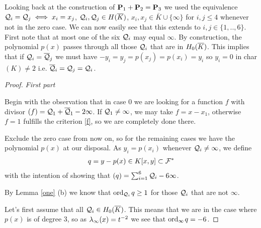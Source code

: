 \documentclass[english,11pt,a4paper]{article}
\begin{document}
\begin{remark}\label{alldiff}
  Looking back at the construction of $\P_1 + \P_2 = \P_3$ we used the equivalence $\q_i = \q_j \iff x_i = x_j$, $\q_i, \q_j \in \ekb$, $x_i, x_j \in \bar K \cup \{\infty\}$ for $i, j \leq 4$ whenever not in the zero case. We can now easily see that this extends to $i, j \in \{1,..,6\}$. First note that at most one of the six $\q_i$ may equal $\infty$. By construction, the polynomial $p(x)$ passes through all those $\q_i$ that are in $\enkb$. This implies that if $\q_i = \bar \q_j$ we must have $-y_i = y_j = p(x_j) = p(x_i) = y_i$ so $y_i = 0$ in char$(K) \neq 2$ i.e. $\bar \q_i =\q_j = \q_i$.
\end{remark}

\newpage
\begin{proof}\textit{First part}

  Begin with the observation that in case 0 we are looking for a function $f$ with divisor $(f) = \q_1 + \bar \q_1 - 2 \infty$. If $\q_1 \neq \infty$, we may take $f = x-x_1$, otherwise $f = 1$ fulfills the criterion \eqref{f}, so we are completely done there.

  Exclude the zero case from now on, so for the remaining cases we have the polynomial $p(x)$ at our disposal. As $y_i = p(x_i)$ whenever $\q_i \neq \infty$, we define%
  \begin{align*}
    q = y -p(x) \in K[x,y] \subset \F^*
  \end{align*}
  with the intention of showing that $(q) = \sum_{i=1}^6 \q_i - 6 \infty$.

  By Lemma \ref{one} (b) we know that $\ordqi q \geq 1$ for those $\q_i$ that are not $\infty$.

  Let's first assume that all $\q_i \in \enkb$. This means that we are in the case where $p(x)$ is of degree 3, so as $\li (x) = t^{-2}$ we see that $\ordi q = -6$.






\end{proof}
\end{document}

